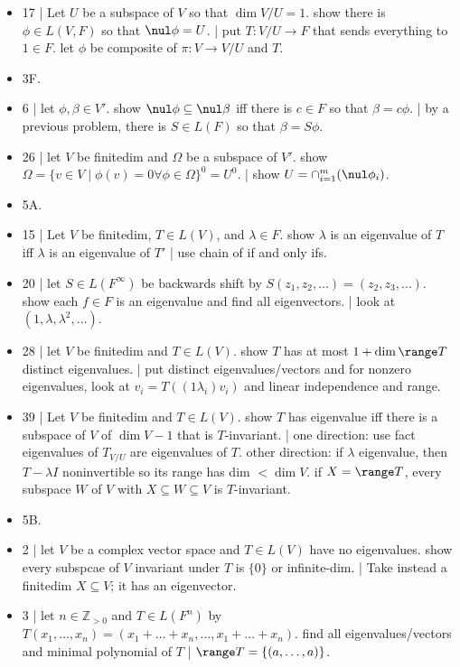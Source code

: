 \begin{itemize}
	\item 17 | Let $U$ be a subspace of $V$ so that $\dim V/U = 1$. show there is $\phi \in L(V,F)$ so that $\nul\phi = U$. | put $T: V/U \to F$ that sends everything to $1 \in F$. let $\phi$ be composite of $\pi: V \to V/U$ and $T$. 
	\item 3F. 
	\item 6 | let $\phi,\beta \in V'$. show $\nul\phi \subseteq \nul\beta$ iff there is $c \in F$ so that $\beta = c\phi$. | by a previous problem, there is $S \in L(F)$ so that $\beta = S\phi$. 
	\item 26 | let $V$ be finitedim and $\Omega$ be a subspace of $V'$. show $\Omega = \{v \in V \mid \phi(v)=0 \forall \phi \in \Omega\}^0 = U^0$. | show $U = \cap_{i=1}^{m} (\nul \phi_i)$. 
	\item 5A. 
	\item 15 | Let $V$ be finitedim, $T \in L(V)$, and $\lambda \in F$. show $\lambda$ is an eigenvalue of $T$ iff $\lambda$ is an eigenvalue of $T'$ | use chain of if and only ifs. 
	\item 20 | let $S \in L(F^\infty)$ be backwards shift by $S(z_1,z_2,\dots) = (z_2,z_3,\dots)$. show each $f \in F$ is an eigenvalue and find all eigenvectors. | look at $(1,\lambda,\lambda^2,\dots)$. 
	\item 28 | let $V$ be finitedim and $T \in L(V)$. show $T$ has at most $1 + \dim\range T$ distinct eigenvalues. | put distinct eigenvalues/vectors and for nonzero eigenvalues, look at $v_i = T((1\lambda_i)v_i)$ and linear independence and range. 
	\item 39 | Let $V$ be finitedim and $T \in L(V)$. show $T$ has eigenvalue iff there is a subspace of $V$ of $\dim V - 1$ that is $T$-invariant. | one direction: use fact eigenvalues of $T_{V/U}$ are eigenvalues of $T$. other direction: if $\lambda$ eigenvalue, then $T-\lambda I$ noninvertible so its range has dim $< \dim V$. if $X = \range T$, every subspace $W$ of $V$ with $X \subseteq W \subseteq V$ is $T$-invariant. 
	\item 5B. 
	\item 2 | let $V$ be a complex vector space and $T \in L(V)$ have no eigenvalues. show every subspcae of $V$ invariant under $T$ is $\{0\}$ or infinite-dim. | Take instead a finitedim $X \subseteq V$; it has an eigenvector. 
	\item 3 | let $n \in \mathbb{Z}_{>0}$ and $T \in L(F^n)$ by $T(x_1,\dots,x_n) = (x_1+\dots+x_n,\dots,x_1+\dots+x_n)$. find all eigenvalues/vectors and minimal polynomial of $T$ | $\range T = \{(a,\dots,a)\}$. 

\end{itemize}
